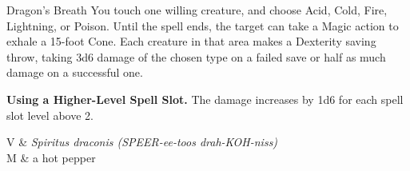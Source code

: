 \begin{Spell}[
  tags=Concentration,
  level=2nd,
  time=1 Bonus Action,
  range=Touch/15 ft cone,
  components={V, S, M},
  duration=1 Minute,
  school=Transmutation,
  attack=DEX Save,
  effect=Acid
]{Dragon's Breath}
You touch one willing creature, and choose Acid, Cold, Fire, Lightning, or Poison. Until the spell ends, the target can take a Magic action to exhale a 15-foot Cone. Each creature in that area makes a Dexterity saving throw, taking 3d6 damage of the chosen type on a failed save or half as much damage on a successful one.

\textbf{Using a Higher-Level Spell Slot.} The damage increases by 1d6 for each spell slot level above 2.

\begin{components}
V & \textit{Spiritus draconis (SPEER-ee-toos drah-KOH-niss)} \\
M & a hot pepper
\end{components}
\end{Spell}


